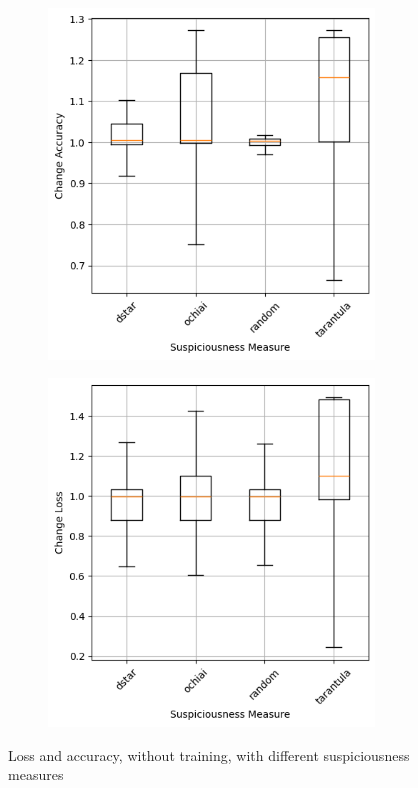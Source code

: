 \begin{figure}
    \begin{subfigure}{0.5\textwidth}
        \centering
        \includegraphics[width=0.95\textwidth]{plots/Meassure_NotTrained_accuracy.png}
    \end{subfigure}
    \begin{subfigure}{0.5\textwidth}
        \centering
        \includegraphics[width=0.95\textwidth]{plots/Meassure_NotTrained_loss.png}
    \end{subfigure}
    \caption{Loss and accuracy, without training, with different suspiciousness measures}
    \label{fig:suspiciousness-measures-notraining}
\end{figure}
